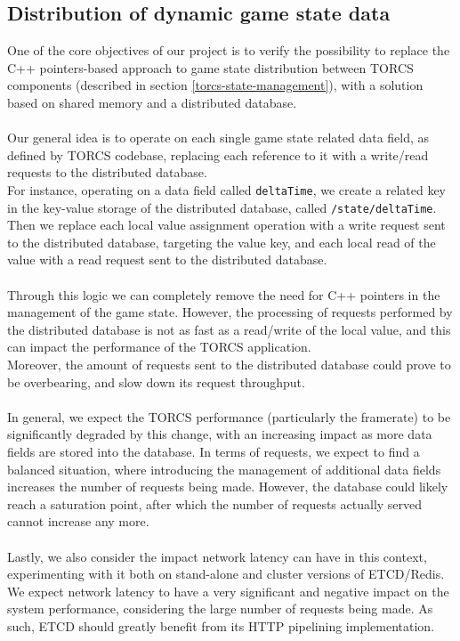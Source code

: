 \subsection{Distribution of dynamic game state data}
One of the core objectives of our project is to verify the possibility to replace the C++ pointers-based approach to game state distribution between TORCS components (described in section \ref{torcs-state-management}), with a solution based on shared memory and a distributed database. \\ \\
Our general idea is to operate on each single game state related data field, as defined by TORCS codebase, replacing each reference to it with a write/read requests to the distributed database. \\
For instance, operating on a data field called \texttt{deltaTime}, we create a related key in the key-value storage of the distributed database, called \texttt{/state/deltaTime}. Then we replace each local value assignment operation with a write request sent to the distributed database, targeting the value key, and each local read of the value with a read request sent to the distributed database. \\ \\
Through this logic we can completely remove the need for C++ pointers in the management of the game state. However, the processing of requests performed by the distributed database is not as fast as a read/write of the local value, and this can impact the performance of the TORCS application. \\
Moreover, the amount of requests sent to the distributed database could prove to be overbearing, and slow down its request throughput. \\ \\
In general, we expect the TORCS performance (particularly the framerate) to be significantly degraded by this change, with an increasing impact as more data fields are stored into the database. In terms of requests, we expect to find a balanced situation, where introducing the management of additional data fields increases the number of requests being made. However, the database could likely reach a saturation point, after which the number of requests actually served cannot increase any more. \\ \\
Lastly, we also consider the impact network latency can have in this context, experimenting with it both on stand-alone and cluster versions of ETCD/Redis. We expect network latency to have a very significant and negative impact on the system performance, considering the large number of requests being made. As such, ETCD should greatly benefit from its HTTP pipelining implementation.

